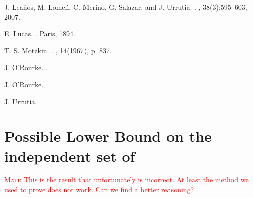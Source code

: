 \documentclass[11pt,a4paper]{article}
\newcommand{\mati}[1]{\textcolor{red}{\textsc{Mati:} #1}}
\newcommand{\sholong}[2]{#2}
\newcommand{\proofguardwithcells}{The first iterations of the algorithm select cells that each cover four new lines. 
We iteratively select a cell covering four lines as long as the average number of segments of uncovered lines bounding a cell is strictly greater than three. The total number of segments is , and each contribute to two cells. Every selected cell discards four lines, and exactly  segments of those. If the cell is bounded by more than four lines, we only discard exactly four of them, arbitrarily. The total number of cells after the th iteration is . The number of iterations is the largest value  that satisfies:

Hence we can select roughly  cells, covering together  lines.

In the second phase of the algorithm, we iteratively select cells covering three new lines. Following the same reasoning, and taking into account the  previously selected cells, we know that the number  of iterations satisfies:

Hence we can select roughly  more cells, covering together  lines.

Overall, we now have  cells covering  lines. It remains to cover the remaining  lines with  cells, each covering two lines, as in Theorem~\ref{warmup:guardwithcells}. The total number of cells is therefore
}
\begin{document}
{\begin{thebibliography}{1}
J. Lea\~{n}os, M. Lomel\'{\i}, C. Merino, G. Salazar, and J. Urrutia.
.
, 38(3):595--603, 2007.

 E. Lucas.
. Paris, 1894.


 T. S. Motzkin.
.
, 14(1967), p. 837.

 J. O'Rourke.
.


 J. O'Rourke.

  J. Urrutia.

\end{thebibliography}
}
\sholong{
\appendix
\section{Proofs omitted from the Document}

\newtheorem*{guardwithcells}{Theorem \ref{guardwithcells}}
\begin{guardwithcells}
Given any set  of  lines, a minimal vertex cover of the corresponding  hypergraph has size at most . Moreover, there exists a set  of  lines, such that every vertex cover of the corresponding  hypergraph has size at least .
\end{guardwithcells}
\begin{proof}
Proof of the lower bound was given in the main document, hence we focus in the upper bound. \proofguardwithcells
\end{proof}
}{}
\iffalse
\newpage
\appendix
\section{Possible Lower Bound on the independent set of }
\mati{This is the result that unfortunately is incorrect. At least the method we used to prove does not work. Can we find a better reasoning?}
\end{document}
